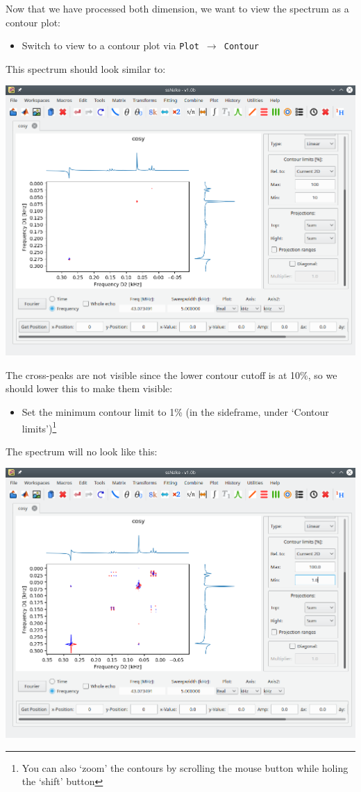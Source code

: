 \documentclass[11pt,a4paper]{article}
\begin{document}
Now that we have processed both dimension, we want to view the spectrum as a contour plot:
\begin{itemize}
  \item Switch to view to a contour plot via \texttt{Plot $\longrightarrow$ Contour}
\end{itemize}
This spectrum should look similar to:
\begin{center}
\includegraphics[width=0.8\linewidth]{Figs/Fig2.png}
\end{center}
The cross-peaks are not visible since the lower contour cutoff is at 10\%, so we should lower this to make them visible:
\begin{itemize}
  \item Set the minimum contour limit to 1\% (in the sideframe, under `Contour
	 limits')\footnote{You can also `zoom' the contours by scrolling the mouse button while
	 holing the `shift' button}
\end{itemize}
The spectrum will no look like this:
\begin{center}
\includegraphics[width=0.8\linewidth]{Figs/Fig3.png}
\end{center}
\end{document}
